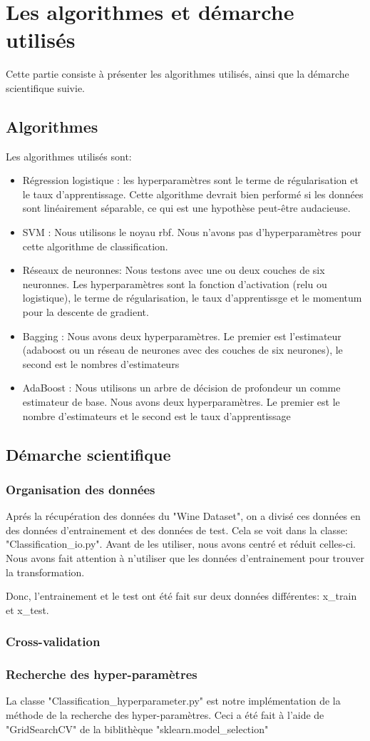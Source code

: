\chapter{Les algorithmes et démarche utilisés}
\par Cette partie consiste à présenter les algorithmes utilisés, ainsi que la démarche scientifique suivie.
\section{Algorithmes}
Les algorithmes utilisés sont:
\begin{itemize}[label=\textbullet]
\item Régression logistique : les hyperparamètres sont le terme de régularisation et le taux d'apprentissage. Cette algorithme devrait bien performé si les données
    sont linéairement séparable, ce qui est une hypothèse peut-être audacieuse.
\item SVM : Nous utilisons le noyau rbf. Nous n'avons pas d'hyperparamètres pour cette algorithme de classification.
\item Réseaux de neuronnes: Nous testons avec une ou deux couches de six neuronnes. Les hyperparamètres sont la fonction d'activation (relu ou logistique), le terme
    de régularisation, le taux d'apprentissge et le momentum pour la descente de gradient.
\item Bagging : Nous avons deux hyperparamètres. Le premier est l'estimateur (adaboost ou un réseau de neurones avec des couches de six neurones), le second est le
    nombres d'estimateurs
\item AdaBoost : Nous utilisons un arbre de décision de profondeur un comme estimateur de base. Nous avons deux hyperparamètres. Le premier est le nombre
    d'estimateurs et le second est le taux d'apprentissage
\end{itemize}

\section{Démarche scientifique}
\subsection{Organisation des données}
\par Aprés la récupération des données du "Wine Dataset", on a divisé ces données en des données d'entrainement et des données de test. Cela se voit dans la classe: "Classification\_io.py". Avant de les utiliser, nous avons centré et réduit celles-ci. Nous avons fait attention à n'utiliser que les données d'entrainement pour trouver
la transformation.
\par Donc, l'entrainement et le test ont été fait sur deux données différentes: x\_train et x\_test.
\subsection{Cross-validation}

\subsection{Recherche des hyper-paramètres}
\par La classe "Classification\_hyperparameter.py" est notre implémentation de la méthode de la recherche des hyper-paramètres. Ceci a été fait à l'aide de "GridSearchCV" de la biblithèque "sklearn.model\_selection"



